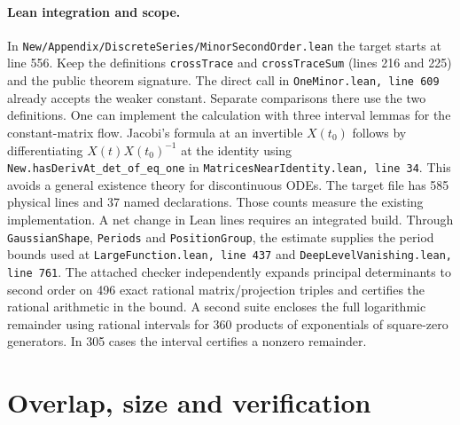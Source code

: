 \documentclass[11pt,letterpaper]{article}
\begin{document}
\paragraph{Lean integration and scope.}
In \texttt{New/Appendix/DiscreteSeries/MinorSecondOrder.lean} the target starts at line 556. Keep the definitions \texttt{crossTrace} and \texttt{crossTraceSum} (lines 216 and 225) and the public theorem signature. The direct call in \texttt{OneMinor.lean, line 609} already accepts the weaker constant. Separate comparisons there use the two definitions. One can implement the calculation with three interval lemmas for the constant-matrix flow. Jacobi's formula at an invertible $X(t_0)$ follows by differentiating $X(t)X(t_0)^{-1}$ at the identity using \texttt{New.hasDerivAt\_det\_of\_eq\_one} in \texttt{MatricesNearIdentity.lean, line 34}. This avoids a general existence theory for discontinuous ODEs. The target file has 585 physical lines and 37 named declarations. Those counts measure the existing implementation. A net change in Lean lines requires an integrated build. Through \texttt{GaussianShape}, \texttt{Periods} and \texttt{PositionGroup}, the estimate supplies the period bounds used at \texttt{LargeFunction.lean, line 437} and \texttt{DeepLevelVanishing.lean, line 761}. The attached checker independently expands principal determinants to second order on 496 exact rational matrix/projection triples and certifies the rational arithmetic in the bound. A second suite encloses the full logarithmic remainder using rational intervals for 360 products of exponentials of square-zero generators. In 305 cases the interval certifies a nonzero remainder.

\section{Overlap, size and verification}
\end{document}
